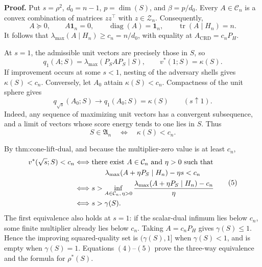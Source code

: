 \textbf{Proof.}
Put \(s=\rho^2\), \(d_0=n-1\), \(p=\dim(S)\), and \(\beta=p/d_0\). Every \(A\in\mathcal C_n\) is a convex combination of matrices \(zz^\top\) with \(z\in\mathcal Z_n\). Consequently,
\[
A\succeq0,
\qquad
A\mathbf1_n=0,
\qquad
\operatorname{diag}(A)=\mathbf1_n,
\qquad
\operatorname{tr}(A\mid H_n)=n.
\tag{1}
\]
It follows that \(\lambda_{\max}(A\mid H_n)\geq c_n=n/d_0\), with equality at \(A_{\mathrm{CRD}}=c_nP_H\).

At \(s=1\), the admissible unit vectors are precisely those in \(S\), so
\[
q_1(A;S)=\lambda_{\max}(P_SAP_S\mid S),
\qquad
v^*(1;S)=\kappa(S).
\tag{2}
\]
If improvement occurs at some \(s<1\), nesting of the adversary shells gives \(\kappa(S)<c_n\). Conversely, let \(A_0\) attain \(\kappa(S)<c_n\). Compactness of the unit sphere gives
\[
q_{\sqrt{s}}(A_0;S)\longrightarrow q_1(A_0;S)=\kappa(S)
\qquad(s\uparrow1).
\tag{3}
\]
Indeed, any sequence of maximizing unit vectors has a convergent subsequence, and a limit of vectors whose score energy tends to one lies in \(S\). Thus
\[
S\in\mathfrak A_n
\quad\Longleftrightarrow\quad
\kappa(S)<c_n.
\tag{4}
\]

By \(\text{thm:cone-lift-dual}\), and because the multiplier-zero value is at least \(c_n\),
\[
\begin{aligned}
v^*(\sqrt{s};S)<c_n
&\Longleftrightarrow
\text{there exist }A\in\mathcal C_n\text{ and }\eta>0\text{ such that}\\
&\hspace{1.5cm}
\lambda_{\max}(A+\eta P_S\mid H_n)-\eta s<c_n\\
&\Longleftrightarrow
s>\inf_{A\in\mathcal C_n,\,\eta>0}
\frac{\lambda_{\max}(A+\eta P_S\mid H_n)-c_n}{\eta}\\
&\Longleftrightarrow s>\gamma(S).
\end{aligned}
\tag{5}
\]
The first equivalence also holds at \(s=1\): if the scalar-dual infimum lies below \(c_n\), some finite multiplier already lies below \(c_n\). Taking \(A=c_nP_H\) gives \(\gamma(S)\leq1\). Hence the improving squared-quality set is \((\gamma(S),1]\) when \(\gamma(S)<1\), and is empty when \(\gamma(S)=1\). Equations \((4)\)--\((5)\) prove the three-way equivalence and the formula for \(\rho^*(S)\).

